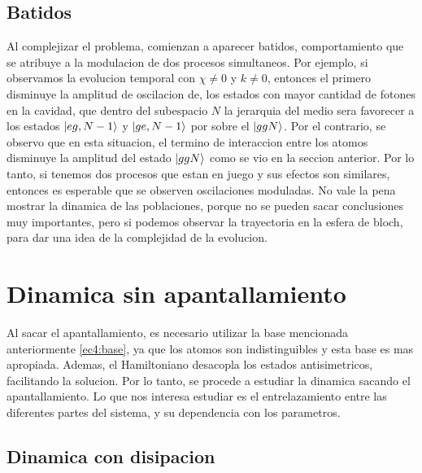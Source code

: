 \subsection{Batidos}

Al complejizar el problema, comienzan a aparecer batidos, comportamiento que se atribuye a la modulacion de dos procesos simultaneos. Por ejemplo, si observamos la evolucion temporal con $\chi\neq0$ y $k\neq0$, entonces el primero disminuye la amplitud de oscilacion de, los estados con mayor cantidad de fotones en la cavidad, que dentro del subespacio $N$ la jerarquia del medio sera favorecer a los estados $\ket{eg,N-1}$ y $\ket{ge,N-1}$ por sobre el $\ket{ggN}$. Por el contrario, se observo que en esta situacion, el termino de interaccion entre los atomos disminuye la amplitud del estado $\ket{ggN}$ como se vio en la seccion anterior. Por lo tanto, si tenemos dos procesos que estan en juego y sus efectos son similares, entonces es esperable que se observen oscilaciones moduladas. No vale la pena mostrar la dinamica de las poblaciones, porque no se pueden sacar conclusiones muy importantes, pero si podemos observar la trayectoria en la esfera de bloch, para dar una idea de la complejidad de la evolucion.

\section{Dinamica sin apantallamiento}

Al sacar el apantallamiento, es necesario utilizar la base mencionada anteriormente \ref{ec4:base}, ya que los atomos son indistinguibles y esta base es mas apropiada. Ademas, el Hamiltoniano desacopla los estados antisimetricos, facilitando la solucion. Por lo tanto, se procede a estudiar la dinamica sacando el apantallamiento. Lo que nos interesa estudiar es el entrelazamiento entre las diferentes partes del sistema, y su dependencia con los parametros. 

\subsection{Dinamica con disipacion}

